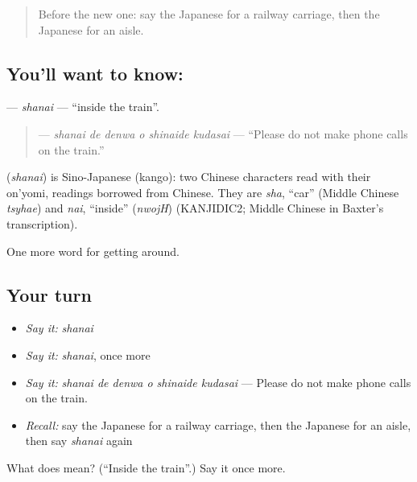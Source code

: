 \begin{quote}
Before the new one: say the Japanese for a railway carriage, then the Japanese for an aisle.
\end{quote}

\subsection*{You'll want to know: }
\textbf{} — \emph{shanai} — \textquotedblleft{}inside the train\textquotedblright{}.

\begin{quote}
\textbf{   } — \emph{shanai de denwa o shinaide kudasai} — \textquotedblleft{}Please do not make phone calls on the train.\textquotedblright{}
\end{quote}

\begin{cousinweb}
\textbf{} (\emph{shanai}) is Sino-Japanese (kango): two Chinese characters read with their on'yomi, readings borrowed from Chinese. They are \emph{sha}, \textquotedblleft{}car\textquotedblright{} (Middle Chinese \emph{tsyhae}) and \emph{nai}, \textquotedblleft{}inside\textquotedblright{} (\emph{nwojH}) (KANJIDIC2; Middle Chinese in Baxter's transcription).
\end{cousinweb}

\begin{grammarlens}[title={What you've built}]
One more word for getting around.
\end{grammarlens}

\subsection*{Your turn}
\begin{itemize}
\raggedright
  \item \emph{Say it:} \emph{shanai}
  \item \emph{Say it:} \emph{shanai}, once more
  \item \emph{Say it:} \emph{shanai de denwa o shinaide kudasai} — Please do not make phone calls on the train.
  \item \emph{Recall:} say the Japanese for a railway carriage, then the Japanese for an aisle, then say \emph{shanai} again
\end{itemize}

\begin{tcolorbox}[breakable,colback=teal!4,colframe=teal!35!black,title={Before you move on}]
What does  mean? (\textquotedblleft{}Inside the train\textquotedblright{}.) Say it once more.
\end{tcolorbox}

